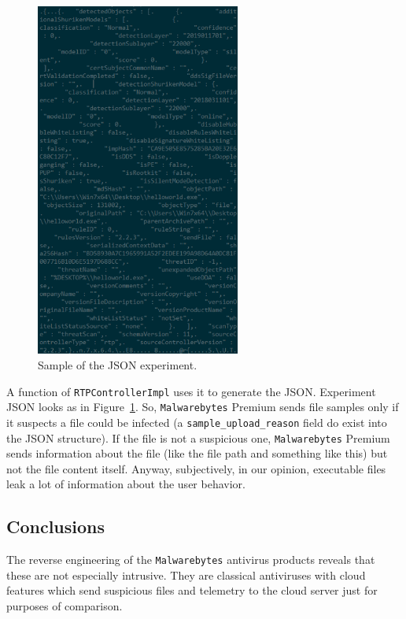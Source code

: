 \begin{figure}
  \centering
  \includegraphics[width=0.6\textwidth]{./figures/ExperimentJSON}
  \caption{\label{fig:ExperimentJSON} Sample of the JSON experiment.}
\end{figure}
A function of \texttt{RTPControllerImpl} uses it to generate the
JSON. Experiment JSON looks as in Figure~\ref{fig:ExperimentJSON}.  So,
\texttt{Malwarebytes} Premium sends file samples only if it suspects a file
could be infected (a \texttt{sample\_upload\_reason} field do exist into the
JSON structure).  If the file is not a suspicious one, \texttt{Malwarebytes}
Premium sends information about the file (like the file path and something
like this) but not the file content itself. Anyway, subjectively, in our
opinion, executable files leak a lot of information about the user behavior.

\subsection{Conclusions}
The reverse engineering of the \texttt{Malwarebytes} antivirus products
reveals that these are not especially intrusive. They are classical
antiviruses with cloud features which send suspicious files and telemetry to
the cloud server just for purposes of comparison.

